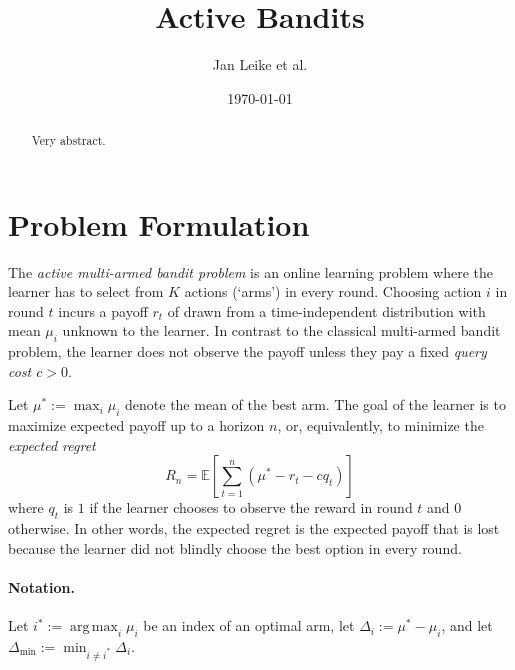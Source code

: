 \documentclass[a4paper]{article}
\DeclareMathOperator*{\argmax}{arg\,max} %
\begin{document}

\title{Active Bandits}
\author{Jan Leike et al.}
\date{\today}

\maketitle


\begin{abstract}
Very abstract.
\end{abstract}


\section{Problem Formulation}

The \emph{active multi-armed bandit problem} is
an online learning problem
where the learner has to select from $K$ actions (`arms') in every round.
Choosing action $i$ in round $t$ incurs a payoff
$r_t$ of drawn from a time-independent distribution with mean $\mu_i$
unknown to the learner.
In contrast to the classical multi-armed bandit problem,
the learner does not observe the payoff
unless they pay a fixed \emph{query cost $c > 0$}.

Let $\mu^* := \max_i \mu_i$ denote the mean of the best arm.
The goal of the learner is to maximize expected payoff up to a horizon $n$,
or, equivalently, to minimize the \emph{expected regret}
\[
R_n = \mathbb{E} \left[ \sum_{t=1}^n (\mu^* - r_t - c q_t) \right]
\]
where $q_t$ is $1$ if the learner chooses to observe the reward in round $t$ and $0$ otherwise.
In other words, the expected regret is the expected payoff
that is lost
because the learner did not blindly choose the best option in every round.

\paragraph{Notation.}
Let $i^* := \argmax_i \mu_i$ be an index of an optimal arm,
let $\Delta_i := \mu^* - \mu_i$, and
let $\Delta_{\min} := \min_{i \neq i^*} \Delta_i$.
\end{document}
